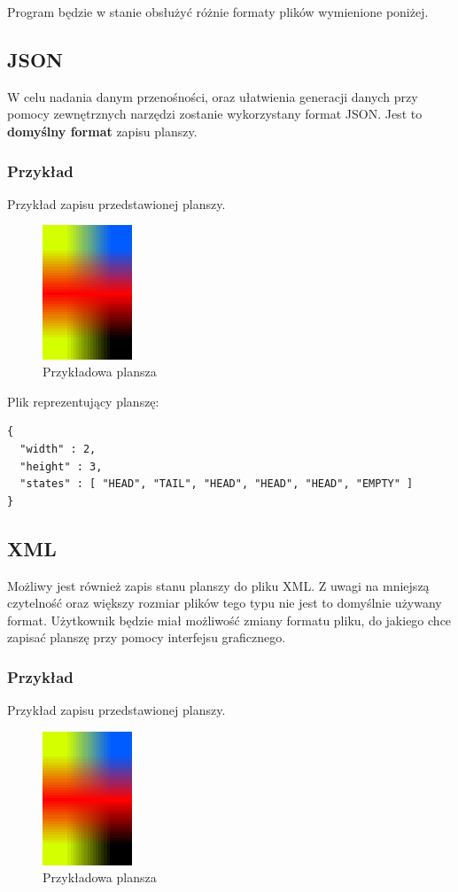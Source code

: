 \documentclass{report}
\begin{document}
Program będzie w stanie obsłużyć różnie formaty plików wymienione poniżej.

\subsection{JSON}
W celu nadania danym przenośności, oraz ułatwienia generacji danych przy pomocy zewnętrznych narzędzi zostanie wykorzystany format JSON. Jest to \textbf{domyślny format} zapisu planszy.

\subsubsection{Przykład}
Przykład zapisu przedstawionej planszy. 

\begin{figure}[H]
    \centering
    \includegraphics[height=4cm]{przyklad-planszy-wireworld}
    \caption{Przykładowa plansza}
\end{figure}

\noindent{}Plik reprezentujący planszę:
\begin{verbatim}
{
  "width" : 2,
  "height" : 3,
  "states" : [ "HEAD", "TAIL", "HEAD", "HEAD", "HEAD", "EMPTY" ]
}
\end{verbatim}

\subsection{XML}
Możliwy jest również zapis stanu planszy do pliku XML. Z uwagi na mniejszą czytelność oraz większy rozmiar plików tego typu nie jest to domyślnie używany format. Użytkownik będzie miał możliwość zmiany formatu pliku, do jakiego chce zapisać planszę przy pomocy interfejsu graficznego.

\subsubsection{Przykład}
Przykład zapisu przedstawionej planszy. 

\begin{figure}[H]
    \centering
    \includegraphics[height=4cm]{przyklad-planszy-wireworld}
    \caption{Przykładowa plansza}
\end{figure}
\end{document}
